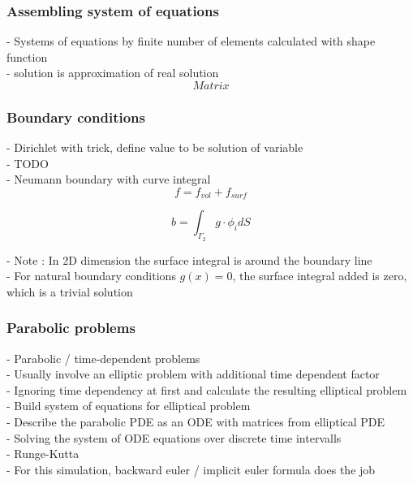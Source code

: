 \documentclass[parskip=half, titlepage=yes, 12pt, BCOR=12mm, DIV=calc]{scrartcl}
\begin{document}
\subsubsection{Assembling system of equations}
- Systems of equations by finite number of elements calculated with shape function \\
- solution is approximation of real solution \\

\begin{equation}
    Matrix
\end{equation}

\subsubsection{Boundary conditions}
- Dirichlet with trick, define value to be solution of variable \\
- TODO \\


- Neumann boundary with curve integral \\

\begin{equation}
    f = f_{vol} + f_{surf}
\end{equation}

\begin{equation}
    b = \int_{\Gamma_2} g \cdot \phi_{i} d S 
\end{equation}

- Note : In 2D dimension the surface integral is around the boundary line \\
- For natural boundary conditions $g(x) = 0$, the surface integral added is zero, which is a trivial solution \\

\subsubsection{Parabolic problems}
- Parabolic / time-dependent problems \\
- Usually involve an elliptic problem with additional time dependent factor \\

- Ignoring time dependency at first and calculate the resulting elliptical problem \\
- Build system of equations for elliptical problem \\

- Describe the parabolic PDE as an ODE with matrices from elliptical PDE \\
- Solving the system of ODE equations over discrete time intervalls \\
- Runge-Kutta \\
- For this simulation, backward euler / implicit euler formula does the job \\
\end{document}
